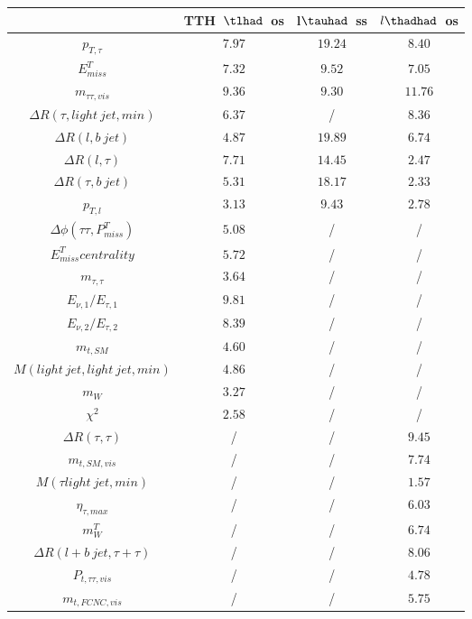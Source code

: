 \begin{tabular}{|c|c|c|c|} \hline
 & TTH~$\tlhad$~os & l$\tauhad$~ss & $l\thadhad$~os\\\hline
$p_{T,\tau }$ & $7.97$ & $19.24$ & $8.40$\\\hline
$E^{T}_{miss}$ & $7.32$ & $9.52$ & $7.05$\\\hline
$m_{\tau \tau ,vis}$ & $9.36$ & $9.30$ & $11.76$\\\hline
$\Delta R(\tau ,light~jet,min)$ & $6.37$ &  / & $8.36$\\\hline
$\Delta R(l,b~jet)$ & $4.87$ & $19.89$ & $6.74$\\\hline
$\Delta R(l,\tau )$ & $7.71$ & $14.45$ & $2.47$\\\hline
$\Delta R(\tau ,b~jet)$ & $5.31$ & $18.17$ & $2.33$\\\hline
$p_{T,l}$ & $3.13$ & $9.43$ & $2.78$\\\hline
$\Delta\phi(\tau \tau ,P^{T}_{miss})$ & $5.08$ &  / &  /\\\hline
$E^{T}_{miss} centrality$ & $5.72$ &  / &  /\\\hline
$m_{\tau ,\tau }$ & $3.64$ &  / &  /\\\hline
$E_{\nu,1}/E_{\tau ,1}$ & $9.81$ &  / &  /\\\hline
$E_{\nu,2}/E_{\tau ,2}$ & $8.39$ &  / &  /\\\hline
$m_{t,SM}$ & $4.60$ &  / &  /\\\hline
$M(light~jet,light~jet,min)$ & $4.86$ &  / &  /\\\hline
$m_{W}$ & $3.27$ &  / &  /\\\hline
$\chi^{2}$ & $2.58$ &  / &  /\\\hline
$\Delta R(\tau ,\tau )$ &  / &  / & $9.45$\\\hline
$m_{t,SM,vis}$ &  / &  / & $7.74$\\\hline
$M(\tau  light~jet,min)$ &  / &  / & $1.57$\\\hline
$\eta_{\tau ,max}$ &  / &  / & $6.03$\\\hline
$m^{T}_{W}$ &  / &  / & $6.74$\\\hline
$\Delta R(l+b~jet,\tau +\tau )$ &  / &  / & $8.06$\\\hline
$P_{t,\tau \tau ,vis}$ &  / &  / & $4.78$\\\hline
$m_{t,FCNC,vis}$ &  / &  / & $5.75$\\\hline
\end{tabular}
